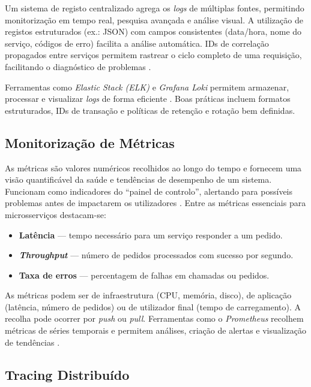Um sistema de registo centralizado agrega os \textit{logs} de múltiplas fontes, permitindo monitorização em tempo real, pesquisa avançada e análise visual. A utilização de registos estruturados (ex.: JSON) com campos consistentes (data/hora, nome do serviço, códigos de erro) facilita a análise automática. IDs de correlação propagados entre serviços permitem rastrear o ciclo completo de uma requisição, facilitando o diagnóstico de problemas \cite{Fu2012}.

Ferramentas como \textit{Elastic Stack (ELK)} e \textit{Grafana Loki} permitem armazenar, processar e visualizar \textit{logs} de forma eficiente \cite{Bajer2017}. Boas práticas incluem formatos estruturados, IDs de transação e políticas de retenção e rotação bem definidas.

\subsection{Monitorização de Métricas}

As métricas são valores numéricos recolhidos ao longo do tempo e fornecem uma visão quantificável da saúde e tendências de desempenho de um sistema. Funcionam como indicadores do “painel de controlo”, alertando para possíveis problemas antes de impactarem os utilizadores \cite{Burns2015}. Entre as métricas essenciais para microsserviços destacam-se:

\begin{itemize}
    \item \textbf{Latência} — tempo necessário para um serviço responder a um pedido.
    \item \textbf{\textit{Throughput}} — número de pedidos processados com sucesso por segundo.
    \item \textbf{Taxa de erros} — percentagem de falhas em chamadas ou pedidos.
\end{itemize}

As métricas podem ser de infraestrutura (CPU, memória, disco), de aplicação (latência, número de pedidos) ou de utilizador final (tempo de carregamento). A recolha pode ocorrer por \textit{push} ou \textit{pull}. Ferramentas como o \textit{Prometheus} recolhem métricas de séries temporais e permitem análises, criação de alertas e visualização de tendências \cite{Burns2015}.


\subsection{Tracing Distribuído}

